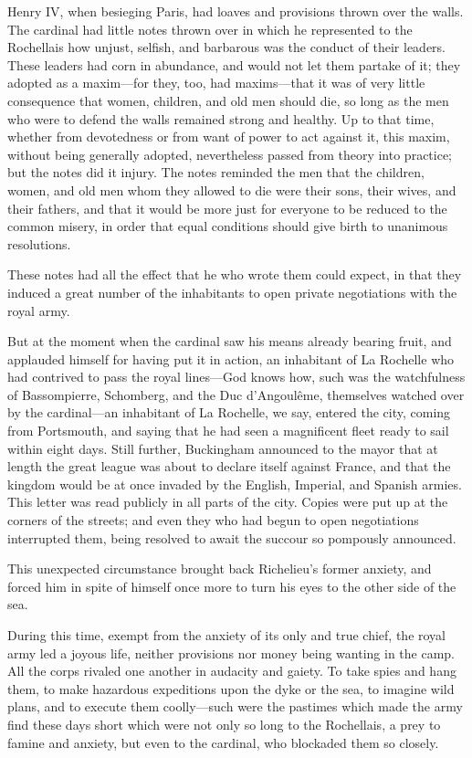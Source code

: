 Henry IV, when besieging Paris, had loaves and provisions thrown over the walls. The cardinal had little notes thrown over in which he represented to the Rochellais how unjust, selfish, and barbarous was the conduct of their leaders. These leaders had corn in abundance, and would not let them partake of it; they adopted as a maxim---for they, too, had maxims---that it was of very little consequence that women, children, and old men should die, so long as the men who were to defend the walls remained strong and healthy. Up to that time, whether from devotedness or from want of power to act against it, this maxim, without being generally adopted, nevertheless passed from theory into practice; but the notes did it injury. The notes reminded the men that the children, women, and old men whom they allowed to die were their sons, their wives, and their fathers, and that it would be more just for everyone to be reduced to the common misery, in order that equal conditions should give birth to unanimous resolutions. 

These notes had all the effect that he who wrote them could expect, in that they induced a great number of the inhabitants to open private negotiations with the royal army. 

But at the moment when the cardinal saw his means already bearing fruit, and applauded himself for having put it in action, an inhabitant of La Rochelle who had contrived to pass the royal lines---God knows how, such was the watchfulness of Bassompierre, Schomberg, and the Duc d'Angoulême, themselves watched over by the cardinal---an inhabitant of La Rochelle, we say, entered the city, coming from Portsmouth, and saying that he had seen a magnificent fleet ready to sail within eight days. Still further, Buckingham announced to the mayor that at length the great league was about to declare itself against France, and that the kingdom would be at once invaded by the English, Imperial, and Spanish armies. This letter was read publicly in all parts of the city. Copies were put up at the corners of the streets; and even they who had begun to open negotiations interrupted them, being resolved to await the succour so pompously announced. 

This unexpected circumstance brought back Richelieu's former anxiety, and forced him in spite of himself once more to turn his eyes to the other side of the sea. 

During this time, exempt from the anxiety of its only and true chief, the royal army led a joyous life, neither provisions nor money being wanting in the camp. All the corps rivaled one another in audacity and gaiety. To take spies and hang them, to make hazardous expeditions upon the dyke or the sea, to imagine wild plans, and to execute them coolly---such were the pastimes which made the army find these days short which were not only so long to the Rochellais, a prey to famine and anxiety, but even to the cardinal, who blockaded them so closely. 

